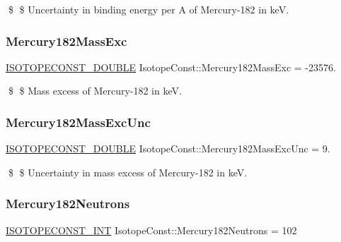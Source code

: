 \$ \$ Uncertainty in binding energy per A of Mercury-\/182 in keV. \mbox{\label{group___isotope_const-_mercury-_hg182_ga8d7a1687fe1415907b9775d2ef145bfc}} 
\subsubsection{\texorpdfstring{Mercury182\+Mass\+Exc}{Mercury182MassExc}}
{\footnotesize\ttfamily \mbox{\hyperlink{group___isotope_const-_macros_ga8f45a7272ce02c0b4c65c44636ed719a}{I\+S\+O\+T\+O\+P\+E\+C\+O\+N\+S\+T\+\_\+\+D\+O\+U\+B\+LE}} Isotope\+Const\+::\+Mercury182\+Mass\+Exc = -\/23576.}

\$ \$ Mass excess of Mercury-\/182 in keV. \mbox{\label{group___isotope_const-_mercury-_hg182_ga411f01a28b806b0d4286ae6e54490946}} 
\subsubsection{\texorpdfstring{Mercury182\+Mass\+Exc\+Unc}{Mercury182MassExcUnc}}
{\footnotesize\ttfamily \mbox{\hyperlink{group___isotope_const-_macros_ga8f45a7272ce02c0b4c65c44636ed719a}{I\+S\+O\+T\+O\+P\+E\+C\+O\+N\+S\+T\+\_\+\+D\+O\+U\+B\+LE}} Isotope\+Const\+::\+Mercury182\+Mass\+Exc\+Unc = 9.}

\$ \$ Uncertainty in mass excess of Mercury-\/182 in keV. \mbox{\label{group___isotope_const-_mercury-_hg182_ga2e472fd77f28577167ff1a4c5dcf7130}} 
\subsubsection{\texorpdfstring{Mercury182\+Neutrons}{Mercury182Neutrons}}
{\footnotesize\ttfamily \mbox{\hyperlink{group___isotope_const-_macros_ga5f18360b3e99483a35c32d789e62621c}{I\+S\+O\+T\+O\+P\+E\+C\+O\+N\+S\+T\+\_\+\+I\+NT}} Isotope\+Const\+::\+Mercury182\+Neutrons = 102}

